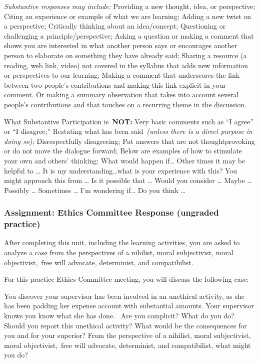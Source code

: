 \documentclass[
]{book}
\begin{document}
\begin{assessment}
\emph{Substantive responses may include:}
Providing a new thought, idea, or perspective;
Citing an experience or example of what we are learning;
Adding a new twist on a perspective;
Critically thinking about an idea/concept;
Questioning or challenging a principle/perspective;
Asking a question or making a comment that shows you are interested in what
another person says or encourages another person to elaborate on something
they have already said;
Sharing a resource (a reading, web link, video) not covered in the syllabus
that adds new information or perspectives to our learning;
Making a comment that underscores the link between two people's
contributions and making this link explicit in your comment. Or making a
summary observation that takes into account several people's contributions
and that touches on a recurring theme in the discussion.

What Substantive Participation is~\textbf{NOT:}
Very basic comments such as ``I agree'' or ``I disagree;''
Restating what has been said~\emph{(unless there is a direct purpose in doing
so);}
Disrespectfully disagreeing;
Pat answers that are not thoughtprovoking or do not move the dialogue
forward;
Below are examples of how to stimulate your own and others' thinking:
What would happen if\ldots{}
Other times it may be helpful to \ldots{}
It is my understanding\ldots what is your experience with this?
You might approach this from \ldots{}
Is it possible that \ldots{}
Would you consider \ldots{}
Maybe \ldots{}
Possibly \ldots{}
Sometimes \ldots{}
I'm wondering if\ldots{}
Do you think \ldots{}

\hypertarget{assignment-ethics-committee-response-ungraded-practice}{%
\subsubsection*{Assignment: Ethics Committee Response (ungraded practice)}\label{assignment-ethics-committee-response-ungraded-practice}}

After completing this unit, including the learning activities, you are asked to
analyze a case from the perspectives of a nihilist, moral subjectivist, moral
objectivist,~free will advocate, determinist, and compatibilist.

For this practice Ethics Committee meeting, you will discuss the following case:

You discover your supervisor has been involved in an unethical activity, as she has been padding her expense account with substantial amounts. Your supervisor knows you know what she has done. ~Are you complicit? What do you do? Should you report this unethical activity? What would be the consequences for you and for your superior? From the perspective of a nihilist, moral subjectivist, moral objectivist,~free will advocate, determinist, and compatibilist, what might you do?


\end{assessment}
\end{document}
